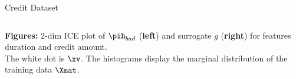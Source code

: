 \documentclass[11pt,compress,t,notes=noshow, aspectratio=169, xcolor=table]{beamer}
\begin{document}
\begin{vbframe}{Credit Dataset}
\begin{columns}
\begin{column}{0.46\textwidth}
	\end{column}
\end{columns}
\vspace{-0.4cm}
\begin{center}
		\tiny{\textbf{Figures:} 2-dim ICE plot of $\pih_{bad}$ (\textbf{left}) and surrogate $g$ (\textbf{right}) for features duration and credit amount. \\The white dot is $\xv$. The histograms display the marginal distribution of the training data $\Xmat$.}
\end{center}

\end{vbframe}

%
%
%
\end{document}
